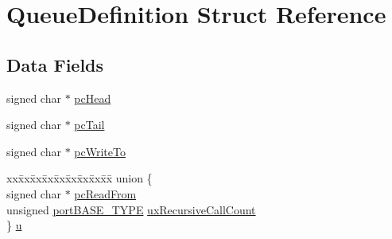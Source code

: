 \hypertarget{struct_queue_definition}{}\section{Queue\+Definition Struct Reference}
\label{struct_queue_definition}
\subsection*{Data Fields}
\begin{DoxyCompactItemize}
\item 
signed char $\ast$ \mbox{\hyperlink{struct_queue_definition_ae27bcbc6d35f837dedc62321501daa49}{pc\+Head}}
\item 
signed char $\ast$ \mbox{\hyperlink{struct_queue_definition_a107296146c82cd122e0ba0756fb89c9d}{pc\+Tail}}
\item 
signed char $\ast$ \mbox{\hyperlink{struct_queue_definition_a019aa270dc6be4b3d0ea3f32e6730529}{pc\+Write\+To}}
\item 
\begin{tabbing}
xx\=xx\=xx\=xx\=xx\=xx\=xx\=xx\=xx\=\kill
union \{\\
\>signed char $\ast$ \mbox{\hyperlink{struct_queue_definition_a6fd0b7b0b51bb9654cdf0899bdaa4936}{pcReadFrom}}\\
\>unsigned \mbox{\hyperlink{portmacro_8h_a1ebe82d24d764ae4e352f7c3a9f92c01}{portBASE\_TYPE}} \mbox{\hyperlink{struct_queue_definition_a0582284771e9c079fa3276a31f3805ad}{uxRecursiveCallCount}}\\
\} \mbox{\hyperlink{struct_queue_definition_ab2c557f3e7a58a29bd07c3c62e7e568a}{u}}\\


\end{tabbing}
\end{DoxyCompactItemize}
